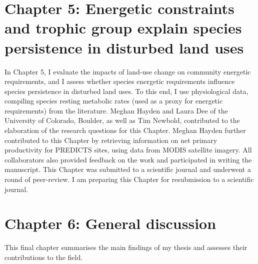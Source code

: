 \section*{Chapter 5: Energetic constraints and trophic group explain species persistence in disturbed land uses}
In Chapter 5, I evaluate the impacts of land-use change on community energetic requirements, and I assess whether species energetic requirements influence species persistence in disturbed land uses. To this end, I use physiological data, compiling species resting metabolic rates (used as a proxy for energetic requirements) from the literature. Meghan Hayden and Laura Dee of the University of Colorado, Boulder, as well as Tim Newbold, contributed to the elaboration of the research questions for this Chapter. Meghan Hayden further contributed to this Chapter by retrieving information on net primary productivity for PREDICTS sites, using data from MODIS satellite imagery. All collaborators also provided feedback on the work and participated in writing the manuscript. This Chapter was submitted to a scientific journal and underwent a round of peer-review. I am preparing this Chapter for resubmission to a scientific journal.

\section*{Chapter 6: General discussion}
This final chapter summarises the main findings of my thesis and assesses their contributions to the field.